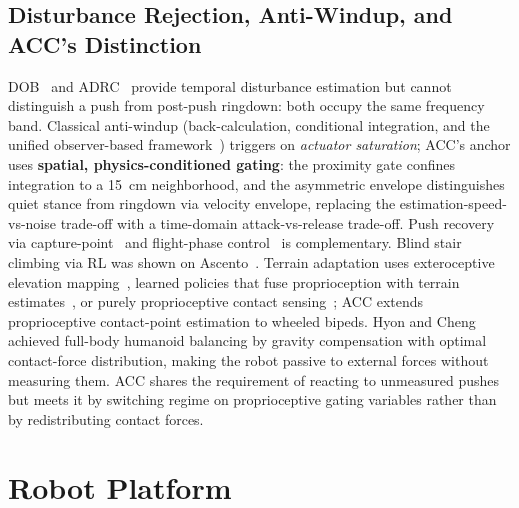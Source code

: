 \documentclass[a4paper,fleqn]{cas-dc}
\begin{document}
\subsection{Disturbance Rejection, Anti-Windup, and ACC's Distinction}
DOB~\cite{ohnishi1993dob,chen2000dob} and ADRC~\cite{han2009adrc,feng2023lqradrc} provide temporal disturbance estimation but cannot distinguish a push from post-push ringdown: both occupy the same frequency band.
Classical anti-windup (back-calculation, conditional integration, and the unified observer-based framework~\cite{astrom1989windup,kothare1994antiwindup,tarbouriech2009aw}) triggers on \emph{actuator saturation}; ACC's anchor uses \textbf{spatial, physics-conditioned gating}: the proximity gate confines integration to a \SI{15}{cm} neighborhood, and the asymmetric envelope distinguishes quiet stance from ringdown via velocity envelope, replacing the estimation-speed-vs-noise trade-off with a time-domain attack-vs-release trade-off.
Push recovery via capture-point~\cite{englsberger2015dcm,pratt2006capturepoint} and flight-phase control~\cite{roscia2023flight} is complementary.
Blind stair climbing via RL was shown on Ascento~\cite{chamorro2024stairclimbing}.
Terrain adaptation uses exteroceptive elevation mapping~\cite{legged_terrain_extero,fankhauser2018rough}, learned policies that fuse proprioception with terrain estimates~\cite{lee2020challenging,miki2022perceptive}, or purely proprioceptive contact sensing~\cite{blind_terrain_proprio,bellicoso2016terrain,camurri2017contact}; ACC extends proprioceptive contact-point estimation to wheeled bipeds.
Hyon and Cheng~\cite{hyon2007gated} achieved full-body humanoid balancing by gravity compensation with optimal contact-force distribution, making the robot passive to external forces without measuring them. ACC shares the requirement of reacting to unmeasured pushes but meets it by switching regime on proprioceptive gating variables rather than by redistributing contact forces.

\section{Robot Platform}
\end{document}
